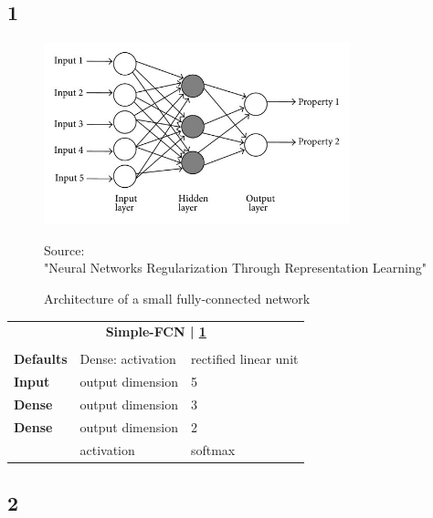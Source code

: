 \subsection*{1}
\begin{figure}[h]
	\centering
	\includegraphics[height=200px]{gfx/2-Background/Dense_FFNetwork.jpg}
	\caption{Architecture of a small fully-connected network}
	\label{fig:FFNetwork}
	\vspace{7pt}
	\footnotesize{ 
		Source:\\
		"Neural Networks Regularization Through Representation Learning" \cite{dense_network}
	}
\end{figure}
\vspace{1.5cm}
\begin{tabularx}{\textwidth}[!h]{X X X}
	\multicolumn{3}{c}{\textbf{Simple-FCN | \ref{fig:FFNetwork}}}\\
	\\
	\hline
	\endhead
	\textbf{Defaults} & Dense: activation & rectified linear unit\\
	\hline
	\textbf{Input} & output dimension & 5\\
	[8pt]
	\textbf{Dense} & output dimension & 3\\
	[8pt]
	\textbf{Dense} & output dimension & 2\\
	& activation & softmax\\
	\hline
\end{tabularx}

\newpage

\subsection*{2}

